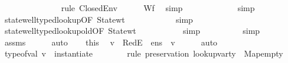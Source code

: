 \begin{isabellebody}
\ \ \ \ \ \ \ \ \ \ \ \ \ \isamarkupfalse%
\ {\isacharparenleft}{\kern0pt}rule\ ClosedEnv{\isacharparenright}{\kern0pt}\isanewline
\ \ \ \ \isamarkupfalse%
\ Wf{\isacharunderscore}{\kern0pt}{\isasymLambda}\ \isamarkupfalse%
\ simp\isanewline
\ \ \ \ \ \ \ \ \ \ \ \isamarkupfalse%
\ simp\isanewline
\ \ \ \ \isamarkupfalse%
\ state{\isacharunderscore}{\kern0pt}well{\isacharunderscore}{\kern0pt}typed{\isacharunderscore}{\kern0pt}lookup{\isacharbrackleft}{\kern0pt}OF\ State{\isacharunderscore}{\kern0pt}wt{\isacharbrackright}{\kern0pt}\isanewline
\ \ \ \ \ \ \ \ \ \ \isamarkupfalse%
\ simp\isanewline
\ \ \ \ \isamarkupfalse%
\ state{\isacharunderscore}{\kern0pt}well{\isacharunderscore}{\kern0pt}typed{\isacharunderscore}{\kern0pt}lookup{\isacharunderscore}{\kern0pt}old{\isacharbrackleft}{\kern0pt}OF\ State{\isacharunderscore}{\kern0pt}wt{\isacharbrackright}{\kern0pt}\isanewline
\ \ \ \ \ \ \ \ \ \isamarkupfalse%
\ simp\isanewline
\ \ \ \ \ \ \ \ \isamarkupfalse%
\ simp\isanewline
\ \ \ \ \isamarkupfalse%
\ assms\isanewline
\ \ \ \ \isamarkupfalse%
\ auto\isanewline
\ \ \isamarkupfalse%
\ this\ \isamarkupfalse%
\ v\ \ RedE{\isacharcolon}{\kern0pt}{\isachardoublequoteopen}{\isasymLambda}{\isacharcomma}{\kern0pt}{\isasymGamma}{\isacharcomma}{\kern0pt}{\isasymOmega}\ {\isasymturnstile}\ {\isasymlangle}e{\isacharcomma}{\kern0pt}n{\isacharunderscore}{\kern0pt}s{\isasymrangle}\ {\isasymDown}\ v{\isachardoublequoteclose}\isanewline
\ \ \ \ \isamarkupfalse%
\ auto\isanewline
\ \ \isamarkupfalse%
\ \isamarkupfalse%
\ {\isachardoublequoteopen}type{\isacharunderscore}{\kern0pt}of{\isacharunderscore}{\kern0pt}val\ v\ {\isacharequal}{\kern0pt}\ instantiate\ {\isasymOmega}\ {\isasymtau}{\isachardoublequoteclose}\isanewline
\ \ \ \ \isamarkupfalse%
\ {\isacharparenleft}{\kern0pt}rule\ preservation{\isacharbrackleft}{\kern0pt}\ {\isacharquery}{\kern0pt}{\isasymDelta}{\isacharequal}{\kern0pt}{\isachardoublequoteopen}{\isacharparenleft}{\kern0pt}lookup{\isacharunderscore}{\kern0pt}var{\isacharunderscore}{\kern0pt}ty\ {\isasymLambda}{\isacharcomma}{\kern0pt}\ Map{\isachardot}{\kern0pt}empty{\isacharparenright}{\kern0pt}{\isachardoublequoteclose}{\isacharbrackright}{\kern0pt}{\isacharparenright}{\kern0pt}\isanewline

\end{isabellebody}
